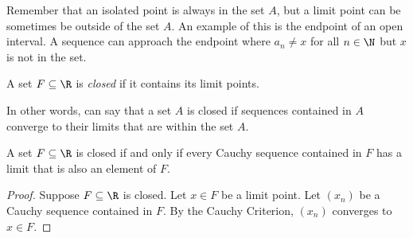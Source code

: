 Remember that an isolated point is always in the set \( A  \), but a limit point can be sometimes be outside of the set \( A \). An example of this is the endpoint of an open interval. A sequence can approach the endpoint where \( a_n \neq x  \) for all \( n \in \N  \) but \( x  \) is not in the set.  

\begin{tcolorbox}
\begin{defn}
A set \( F \subseteq \R  \) is \textit{closed} if it contains its limit points. 
\end{defn}
\end{tcolorbox}

In other words, can say that a set \( A  \) is closed if sequences contained in \(  A  \) converge to their limits that are within the set \( A  \). 

\begin{tcolorbox}
\begin{thm}
A set \( F \subseteq \R \) is closed if and only if every Cauchy sequence contained in \( F \) has a limit that is also an element of \( F \). 
\end{thm}
\end{tcolorbox}

\begin{proof}
    Suppose \( F \subseteq \R  \) is closed. Let \( x \in F \) be a limit point. Let \( (x_n) \) be a Cauchy sequence contained in \( F  \). By the Cauchy Criterion, \( (x_n) \) converges to \( x \in F  \). 
\end{proof}

